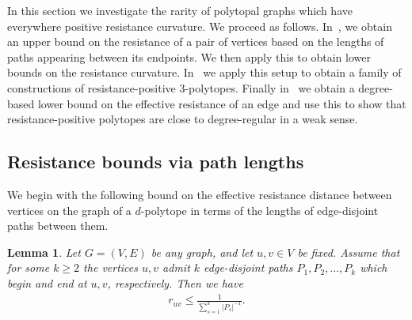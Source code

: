 \documentclass[11pt,a4paper]{amsart}
\newtheorem{lemma}[theorem]{Lemma}
\begin{document}
In this section we investigate the rarity of polytopal graphs which have everywhere positive resistance curvature. We proceed as follows. In~, we obtain an upper bound on the resistance of a pair of vertices based on the lengths of paths appearing between its endpoints. We then apply this to obtain lower bounds on the resistance curvature. In~ we apply this setup to obtain a family of constructions of resistance-positive $3$-polytopes. Finally in~ we obtain a degree-based lower bound on the effective resistance of an edge and use this to show that resistance-positive polytopes are close to degree-regular in a weak sense.

\subsection{Resistance bounds via path lengths}\label{subsec:resistance-positivity}
We begin with the following bound on the effective resistance distance between vertices on the graph of a $d$-polytope in terms of the lengths of edge-disjoint paths between them.

\begin{lemma}\label{lem:resistance-bound}
    Let $G=(V,E)$ be any graph, and let $u, v\in V$ be fixed. Assume that for some $k\geq 2$ the vertices $u, v$ admit $k$ edge-disjoint paths $P_1, P_2,\dotsc, P_k$ which begin and end at $u, v$, respectively. Then we have
        \begin{align*}
            r_{uv} \leq \frac{1}{\sum_{s=1}^k |P_s|^{-1}}.
        \end{align*}
\end{lemma}
\end{document}
